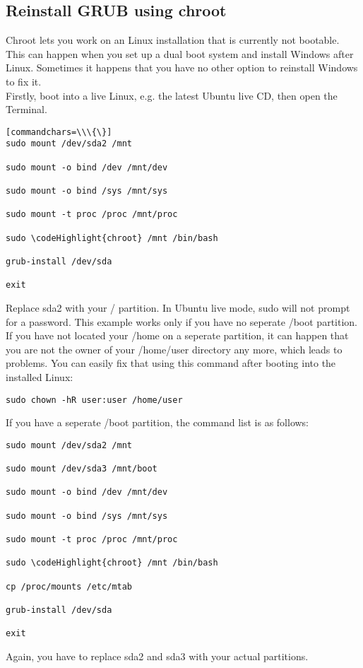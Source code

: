 \documentclass[12pt,a4paper]{article}
\begin{document}
\subsection{Reinstall GRUB using chroot}
Chroot lets you work on an Linux installation that is currently not bootable. This can happen when you set up a dual boot system and install Windows after Linux. Sometimes it happens that you have no other option to reinstall Windows to fix it. \\ Firstly, boot into a live Linux, e.g. the latest Ubuntu live CD, then open the Terminal.
\begin{verbatim}[commandchars=\\\{\}]
sudo mount /dev/sda2 /mnt 

sudo mount -o bind /dev /mnt/dev
 
sudo mount -o bind /sys /mnt/sys 

sudo mount -t proc /proc /mnt/proc
 
sudo \codeHighlight{chroot} /mnt /bin/bash
 
grub-install /dev/sda 

exit
\end{verbatim}
Replace sda2 with your / partition. In Ubuntu live mode, sudo will not prompt for a password. This example works only if you have no seperate /boot partition. If you have not located your /home on a seperate partition, it can happen that you are not the owner of your /home/user directory any more, which leads to problems. You can easily fix that using this command after booting into the installed Linux:
\begin{verbatim}
sudo chown -hR user:user /home/user
\end{verbatim}
If you have a seperate /boot partition, the command list is as follows:
\begin{verbatim}
sudo mount /dev/sda2 /mnt

sudo mount /dev/sda3 /mnt/boot 

sudo mount -o bind /dev /mnt/dev

sudo mount -o bind /sys /mnt/sys

sudo mount -t proc /proc /mnt/proc

sudo \codeHighlight{chroot} /mnt /bin/bash

cp /proc/mounts /etc/mtab

grub-install /dev/sda

exit 
\end{verbatim}
Again, you have to replace sda2 and sda3 with your actual partitions. 
\end{document}
